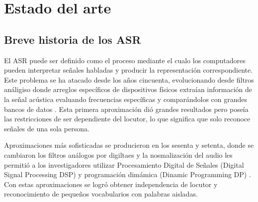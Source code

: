 


\chapter{Estado del arte}

\section{Breve historia de los ASR}

El ASR puede ser definido como el proceso mediante el cualo los computadores pueden interpretar señales habladas y producir la representación correspondiente. Este problema se ha atacado desde los años cincuenta, evolucionando desde filtros análigiso donde arreglos específicos de dispositivos físicos extraían información de la señal acústica evaluando frecuencias específicas y comparándolos con grandes bancos de datos \cite{Davis1952AutomaticDigits,Olson1957PhoneticTypewriter}. Esta primera aproximación dió grandes resultados pero poseía las restricciones de ser dependiente del locutor, lo que significa que solo reconoce señales de una sola persona.

Aproximaciones más sofisticadas se producieron en los sesenta y setenta, donde se cambiaron los filtros análogos por digiltaes y la nosmalización del audio les permitió a los investigadores utilizar Procesamiento Digital de Señales (Digital Signal Processing DSP) y programación dimámica (Dinamic Programming DP) \cite{Velichko1970AutomaticWords,Sakoe1978DynamicRecognition,Itakura1975MinimumRecognition}. Con estas aproximaciones se logró obtener independencia de locutor y reconocimiento de pequeños vocabularios con palabras aisladas.

